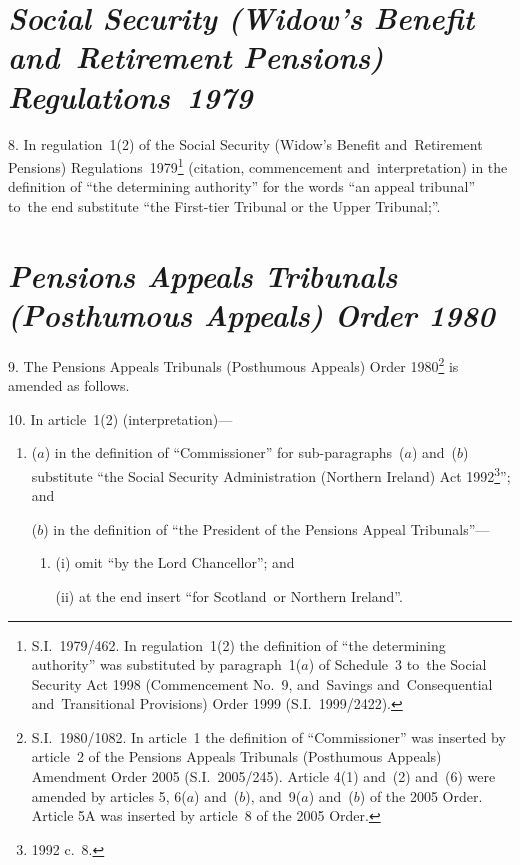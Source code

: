 \documentclass[12pt,a4paper]{article}
\begin{document}
\section*{\itshape Social Security (Widow’s Benefit and~Retirement Pensions) Regulations~1979}

8.  In regulation~1(2) of the Social Security (Widow’s Benefit and~Retirement Pensions) Regulations~1979\footnote{S.I.~1979/462. In regulation~1(2) the definition of “the determining authority” was substituted by paragraph~1($a$) of Schedule~3 to~the Social Security Act 1998 (Commencement No.~9, and~Savings and~Consequential and~Transitional Provisions) Order 1999 (S.I.~1999/2422).} (citation, commencement and~interpretation) in the definition of “the determining authority” for the words “an appeal tribunal” to~the end substitute “the First-tier Tribunal or the Upper Tribunal;”.

\section*{\itshape Pensions Appeals Tribunals (Posthumous Appeals) Order 1980}

9.  The Pensions Appeals Tribunals (Posthumous Appeals) Order 1980\footnote{S.I.~1980/1082. In article~1 the definition of “Commissioner” was inserted by article~2 of the Pensions Appeals Tribunals (Posthumous Appeals) Amendment Order 2005 (S.I.~2005/245). Article 4(1) and~(2) and~(6) were amended by articles 5, 6($a$) and~($b$), and~9($a$) and~($b$) of the 2005 Order. Article 5A was inserted by article~8 of the 2005 Order.} is amended as follows.

\medskip

10.  In article~1(2) (interpretation)—
\begin{enumerate}\item[]
($a$) in the definition of “Commissioner” for sub-paragraphs~($a$)  and~($b$)  substitute “the Social Security Administration (Northern Ireland) Act 1992\footnote{1992 c.~8.}”; and

($b$) in the definition of “the President of the Pensions Appeal Tribunals”—
\begin{enumerate}\item[]
(i) omit “by the Lord Chancellor”; and

(ii) at the end insert “for Scotland~or Northern Ireland”.
\end{enumerate}
\end{enumerate}

\medskip
\end{document}
